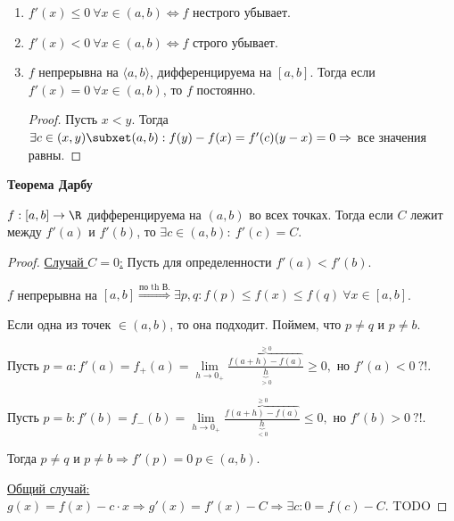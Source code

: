 \begin{corollary}
\begin{enumerate}
        \begin{proof}
            $f(x)=x^3$ строго возрастает, хотя $f'(0)=0$.
        \end{proof}

        \item $f'(x)\leq 0\ \forall x\in (a,b)\Leftrightarrow f$ нестрого убывает.

        \item $f'(x) < 0\ \forall x\in (a,b)\Leftrightarrow f$ строго убывает.

        \item $f$ непрерывна на $\langle a,b\rangle$, дифференцируема на $[a,b]$. Тогда если $f'(x)=0\ \forall x\in (a,b)$, то $f$ постоянно.

        \begin{proof}
            Пусть $x<y$. Тогда $\exists c\in (x,y)\subxet (a,b): f(y)-f(x)=f'(c)(y-x)=0\Rightarrow$ все значения равны.
        \end{proof}
    \end{enumerate}
\end{corollary}

\begin{theorem}
    \textbf{Теорема Дарбу}

    $f:[a,b]\rightarrow \R$ дифференцируема на $(a,b)$ во всех точках. Тогда если $C$ лежит между $f'(a)$ и $f'(b)$, то $\exists c\in (a,b):\ f'(c)=C$.
\end{theorem}

\begin{proof}
    \underline{Случай $C=0$:} Пусть для определенности $f'(a)<f'(b)$.

    $f$ непрерывна на $[a,b]\overset{\text{по th В.}}{\Rightarrow}\exists p, q:f(p)\leq f(x)\leq f(q)\ \forall x\in [a,b]$.

    Если одна из точек $\in (a,b)$, то она подходит. Поймем, что $p\neq q$ и $p\neq b$.

    Пусть $p=a:f'(a)=f_+(a)=\lim\limits_{h\rightarrow 0_+}\frac{\overbrace{f(a+h)-f(a)}^{\geq 0}}{\underbrace{h}_{>0}}\geq 0,$ но $f'(a)<0\ ?!$.

    Пусть $p=b:f'(b)=f_-(b)=\lim\limits_{h\rightarrow 0_+}\frac{\overbrace{f(a+h)-f(a)}^{\geq 0}}{\underbrace{h}_{<0}}\leq 0,$ но $f'(b)>0\ ?!$.

    Тогда $p\neq q$ и $p\neq b\Rightarrow f'(p)=0\ p\in (a,b)$.

    \underline{Общий случай:} $g(x)=f(x)-c\cdot x\Rightarrow g'(x)=f'(x)-C\Rightarrow\exists c:0=f(c)-C$.
    TODO
\end{proof}

